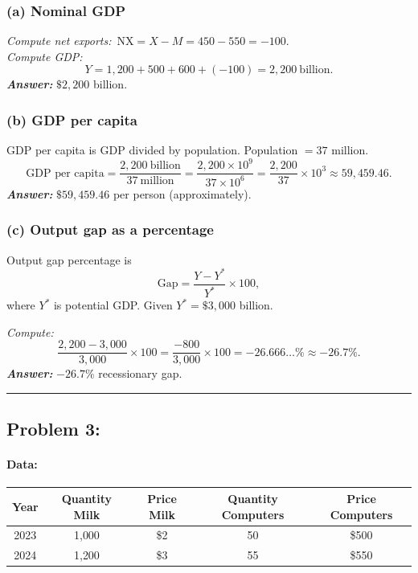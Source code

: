 \documentclass[11pt]{article}
\begin{document}
\subsubsection*{(a) Nominal GDP}
\emph{Compute net exports:}\ \(\text{NX}=X-M=450-550=-100.\)\\
\emph{Compute GDP:}
\[
Y=1{,}200+500+600+(-100)=2{,}200\ \text{billion}.
\]
\emph{\textbf{Answer:}} \(\$2{,}200\) billion.

\subsubsection*{(b) GDP per capita}
 GDP per capita is GDP divided by population. Population \(=37\) million.
\[
\text{GDP per capita}=
\frac{2{,}200\ \text{billion}}{37\ \text{million}}
=
\frac{2{,}200\times 10^9}{37\times 10^6}
=
\frac{2{,}200}{37}\times 10^3
\approx 59{,}459.46.
\]
\emph{\textbf{Answer:}} \(\$59{,}459.46\) per person (approximately).

\subsubsection*{(c) Output gap as a percentage}
Output gap percentage is
\[
\text{Gap}=\frac{Y-Y^\ast}{Y^\ast}\times 100,
\]
where \(Y^\ast\) is potential GDP. Given \(Y^\ast=\$3{,}000\) billion.

\emph{Compute:}
\[
\frac{2{,}200-3{,}000}{3{,}000}\times 100
=
\frac{-800}{3{,}000}\times 100
=
-26.666\ldots\%
\approx -26.7\%.
\]
\emph{\textbf{Answer:}} \(-26.7\%\) recessionary gap.

\bigskip
\hrule
\bigskip

\subsection*{Problem 3:}

\paragraph{Data:}
\begin{center}
\begin{tabular}{c c c c c}
\toprule
Year & Quantity Milk & Price Milk & Quantity Computers & Price Computers \\
\midrule
2023 & 1{,}000 & \$2 & 50 & \$500 \\
2024 & 1{,}200 & \$3 & 55 & \$550 \\
\bottomrule
\end{tabular}
\end{center}
\end{document}
